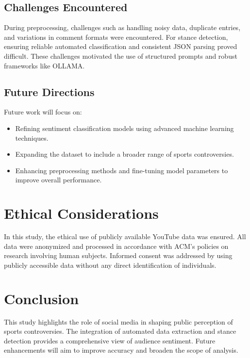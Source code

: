 \documentclass[sigconf, review]{acmart}
\begin{document}
\subsection{Challenges Encountered}
During preprocessing, challenges such as handling noisy data, duplicate entries, and variations in comment formats were encountered. For stance detection, ensuring reliable automated classification and consistent JSON parsing proved difficult. These challenges motivated the use of structured prompts and robust frameworks like OLLAMA.

\subsection{Future Directions}
Future work will focus on:
\begin{itemize}
  \item Refining sentiment classification models using advanced machine learning techniques.
  \item Expanding the dataset to include a broader range of sports controversies.
  \item Enhancing preprocessing methods and fine-tuning model parameters to improve overall performance.
\end{itemize}

\section{Ethical Considerations}
In this study, the ethical use of publicly available YouTube data was ensured. All data were anonymized and processed in accordance with ACM's policies on research involving human subjects. Informed consent was addressed by using publicly accessible data without any direct identification of individuals.

\section{Conclusion}
This study highlights the role of social media in shaping public perception of sports controversies. The integration of automated data extraction and stance detection provides a comprehensive view of audience sentiment. Future enhancements will aim to improve accuracy and broaden the scope of analysis.





\end{document}
